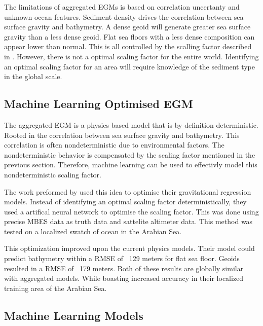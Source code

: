\par
The limitations of aggregated \ac{EGM}s is based on correlation uncertanty and unknown ocean features.
Sediment density drives the correlation between sea surface gravity and bathymetry.
A dense geoid will generate greater sea surface gravity than a less dense geoid.
Flat sea floors with a less dense composition can appear lower than normal.
This is all controlled by the scalling factor described in \cite{smith1994bathymetric}. 
However, there is not a optimal scaling factor for the entire world.
Identifying an optimal scaling factor for an area will require knowledge of the sediment type in the global scale.


\subsection{Machine Learning Optimised \ac{EGM}}
The aggregated \ac{EGM} is a physics based model that is by definition deterministic.
Rooted in the correlation between sea surface gravity and bathymetry.
This correlation is often nondeterministic due to environmental factors.
The nondeterministic behavior is compensated by the scaling factor mentioned in the previous section.
Therefore, machine learning can be used to effectivly model this nondeterministic scaling factor.

\par
The work preformed by \cite{jena2012prediction} used this idea to optimise their gravitational regression models.
Instead of identifying an optimal scaling factor deterministically, they used a artifical neural network to optimise the scaling factor.
This was done using precise \ac{MBES} data as truth data and sattelite altimeter data.
This method was tested on a localized swatch of ocean in the Arabian Sea.

\par
This optimization improved upon the current physics models.
Their model could predict bathymetry within a \ac{RMSE} of ~129 meters for flat sea floor.
Geoids resulted in a \ac{RMSE} of ~179 meters.
Both of these results are globally similar with aggregated models.
While boasting increased accuracy in their localized training area of the Arabian Sea.

\subsection{Machine Learning Models}